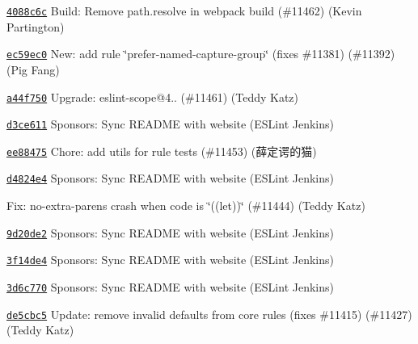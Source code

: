 \begin{DoxyItemize}
\item \href{https://github.com/eslint/eslint/commit/4088c6c9d4578cd581ce8ff4385d90b58a75b755}{\texttt{ {\ttfamily 4088c6c}}} Build\+: Remove path.\+resolve in webpack build (\#11462) (Kevin Partington)
\item \href{https://github.com/eslint/eslint/commit/ec59ec09c8d001b8c04f9edc09994e2b0d0af0f9}{\texttt{ {\ttfamily ec59ec0}}} New\+: add rule \char`\"{}prefer-\/named-\/capture-\/group\char`\"{} (fixes \#11381) (\#11392) (Pig Fang)
\item \href{https://github.com/eslint/eslint/commit/a44f75073306e5ea4e6722654009a99884fbca4f}{\texttt{ {\ttfamily a44f750}}} Upgrade\+: eslint-\/scope@4.. (\#11461) (Teddy Katz)
\item \href{https://github.com/eslint/eslint/commit/d3ce611e1c705440ccbcae357f2194134d026541}{\texttt{ {\ttfamily d3ce611}}} Sponsors\+: Sync R\+E\+A\+D\+ME with website (E\+S\+Lint Jenkins)
\item \href{https://github.com/eslint/eslint/commit/ee884754e4111e11994ff0df3f0c29e43e1dc3f2}{\texttt{ {\ttfamily ee88475}}} Chore\+: add utils for rule tests (\#11453) (薛定谔的猫)
\item \href{https://github.com/eslint/eslint/commit/d4824e46d7a6ca1618454d3c6198403382108123}{\texttt{ {\ttfamily d4824e4}}} Sponsors\+: Sync R\+E\+A\+D\+ME with website (E\+S\+Lint Jenkins)
\item \href{https://github.com/eslint/eslint/commit/64895185bde5233223648bcaf46f8deb72c9fb55}{\texttt{ {}}} Fix\+: no-\/extra-\/parens crash when code is \char`\"{}((let))\char`\"{} (\#11444) (Teddy Katz)
\item \href{https://github.com/eslint/eslint/commit/9d20de2b0ac756bd62888119b8e08c7441d8a5aa}{\texttt{ {\ttfamily 9d20de2}}} Sponsors\+: Sync R\+E\+A\+D\+ME with website (E\+S\+Lint Jenkins)
\item \href{https://github.com/eslint/eslint/commit/3f14de458ba120e9c013f5fc7c6fe3e9b40c1460}{\texttt{ {\ttfamily 3f14de4}}} Sponsors\+: Sync R\+E\+A\+D\+ME with website (E\+S\+Lint Jenkins)
\item \href{https://github.com/eslint/eslint/commit/3d6c7709d47e047b25d91ca1a77d6dab92313061}{\texttt{ {\ttfamily 3d6c770}}} Sponsors\+: Sync R\+E\+A\+D\+ME with website (E\+S\+Lint Jenkins)
\item \href{https://github.com/eslint/eslint/commit/de5cbc526b30405e742b35d85d04361529d49ed4}{\texttt{ {\ttfamily de5cbc5}}} Update\+: remove invalid defaults from core rules (fixes \#11415) (\#11427) (Teddy Katz)

\end{DoxyItemize}

